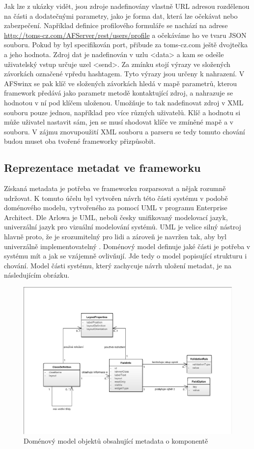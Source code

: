 Jak lze z ukázky vidět, jsou zdroje nadefinovány vlastně URL adresou rozdělenou na části a dodatečnými parametry, jako je forma dat, která lze očekávat nebo zabezpečení. Například definice profilového formuláře se nachází na adrese \url{http://toms-cz.com/AFServer/rest/users/profile} a očekáváme ho ve tvaru JSON souboru. Pokud by byl specifikován port, přibude za toms-cz.com ještě dvojtečka a jeho hodnota. Zdroj dat je nadefinován v uzlu <data> a kam se odešle uživatelský vstup určuje uzel <send>.
Za zmínku stojí výrazy ve složených závorkách označené vpředu hashtagem. Tyto výrazy jsou určeny k nahrazení. V AFSwinx se pak klíč ve složených závorkách hledá v mapě parametrů, kterou framework předává jako parametr metodě kontaktující zdroj, a nahrazuje se hodnotou v ní pod klíčem uloženou. Umožňuje to tak nadefinovat zdroj v XML souboru pouze jednou, například pro více různých uživatelů. Klíč a hodnotu si může uživatel nastavit sám, jen se musí shodovat klíče ve zmíněné mapě a v souboru. V zájmu znovupoužití XML souboru a parseru se tedy tomuto chování budou muset oba tvořené frameworky přizpůsobit.

\subsection{Reprezentace metadat ve frameworku}
Získaná metadata je potřeba ve frameworku rozparsovat a nějak rozumně udržovat. K tomuto účelu byl vytvořen návrh této části systému v podobě doménového modelu, vytvořeného za pomocí UML v programu Enterprise Architect. Dle Arlowa je UML, neboli česky unifikovaný modelovací jazyk, univerzální jazyk pro vizuální modelování systémů. UML je velice silný nástroj hlavně proto, že je srozumitelný pro lidi a zároveň je navržen tak, aby byl univerzálně implementovatelný \cite{viz-plocha-citace-arlow}. Doménový model definuje jaké části je potřeba v systému mít a jak se vzájemně ovlivňují. Jde tedy o model popisující strukturu i chování. Model části systému, který zachycuje návrh uložení metadat, je na následujícím obrázku.

\begin{figure}[h!]
\includegraphics[width=\textwidth]{figures/domainModel}
\caption{Doménový model objektů obsahující metadata o komponentě}
\label{img:metadataModel}
\end{figure}

